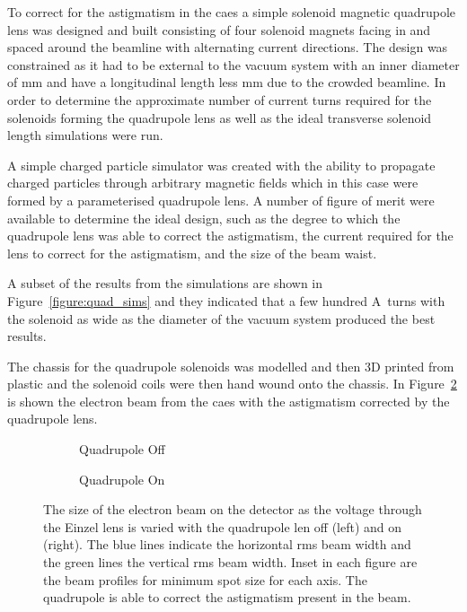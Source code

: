 To correct for the astigmatism in the \gls{caes} a simple solenoid magnetic quadrupole lens was designed and built consisting of four solenoid magnets facing in and spaced around the beamline with alternating current directions.
The design was constrained as it had to be external to the vacuum system with an inner diameter of \unit[70]{mm} and have a longitudinal length less \unit[20]{mm} due to the crowded beamline.
In order to determine the approximate number of current turns required for the solenoids forming the quadrupole lens as well as the ideal transverse solenoid length simulations were run.

A simple charged particle simulator was created with the ability to propagate charged particles through arbitrary magnetic fields which in this case were formed by a parameterised quadrupole lens.
A number of figure of merit were available to determine the ideal design, such as the degree to which the quadrupole lens was able to correct the astigmatism, the current required for the lens to correct for the astigmatism, and the size of the beam waist.

A subset of the results from the simulations are shown in Figure~\ref{figure:quad_sims} and they indicated that a few hundred \unit{A turns} with the solenoid as wide as the diameter of the vacuum system produced the best results.

The chassis for the quadrupole solenoids was modelled and then 3D printed from plastic and the solenoid coils were then hand wound onto the chassis.
In Figure~\ref{figure:quadrupole_scans_on} is shown the electron beam from the \gls{caes} with the astigmatism corrected by the quadrupole lens.

\begin{figure}
    \centering
    \begin{subfigure}{0.49\linewidth}
    \centering
    
    \caption{Quadrupole Off}
    \label{figure:quadrupole_scans_off}
    \end{subfigure}
    \begin{subfigure}{0.49\linewidth}
    \centering
    
    \caption{Quadrupole On}
    \label{figure:quadrupole_scans_on}
    \end{subfigure}
    \caption{The size of the electron beam on the detector as the voltage through the Einzel lens is varied with the quadrupole len off (left) and on (right). The blue lines indicate the horizontal \gls{rms} beam width and the green lines the vertical \gls{rms} beam width. Inset in each figure are the beam profiles for minimum spot size for each axis. The quadrupole is able to correct the astigmatism present in the beam.}
    \label{figure:quadrupole_scans}
\end{figure}

